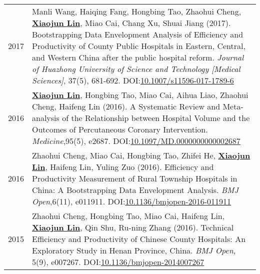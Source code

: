 \documentclass{resume}
\begin{document}
\begin{longtable}{r p{14cm}}
2017 & Manli Wang, Haiqing Fang, Hongbing Tao, Zhaohui Cheng, \underline{\textbf{Xiaojun Lin}}, Miao Cai, Chang Xu, Shuai Jiang (2017). Bootstrapping Data Envelopment Analysis of Efficiency and Productivity of County Public Hospitals in Eastern, Central, and Western China after the public hospital reform. \emph{ Journal of Huazhong University of Science and Technology [Medical Sciences]}, 37(5), 681-692. DOI:\href{https://doi.org/10.1007/s11596-017-1789-6}{10.1007/s11596-017-1789-6}\\
2016 &  \underline{\textbf{Xiaojun Lin}}, Hongbing Tao, Miao Cai, Aihua Liao, Zhaohui Cheng, Haifeng Lin (2016). A Systematic Review and Meta-analysis of the Relationship between Hospital Volume and the Outcomes of Percutaneous Coronary Intervention.  \emph{ Medicine},95(5), e2687. DOI:\href{https://doi.org/10.1097/MD.0000000000002687}{10.1097/MD.0000000000002687}\\
2016 &  Zhaohui Cheng, Miao Cai, Hongbing Tao, Zhifei He, \underline{\textbf{Xiaojun Lin}}, Haifeng Lin, Yuling Zuo (2016). Efficiency and Productivity Measurement of Rural Township Hospitals in China: A Bootstrapping Data Envelopment Analysis. \emph{ BMJ Open},6(11), e011911. DOI:\href{https://doi.org/10.1136/bmjopen-2016-011911}{10.1136/bmjopen-2016-011911}\\
2015 & Zhaohui Cheng, Hongbing Tao, Miao Cai, Haifeng Lin, \underline{\textbf{Xiaojun Lin}}, Qin Shu, Ru-ning Zhang (2016). Technical Efficiency and Productivity of Chinese County Hospitals: An Exploratory Study in Henan Province, China. \emph{ BMJ Open}, 5(9), e007267. DOI:\href{https://doi.org/10.1136/bmjopen-2014007267}{10.1136/bmjopen-2014007267}\\ 
\end{longtable}
\end{document}

